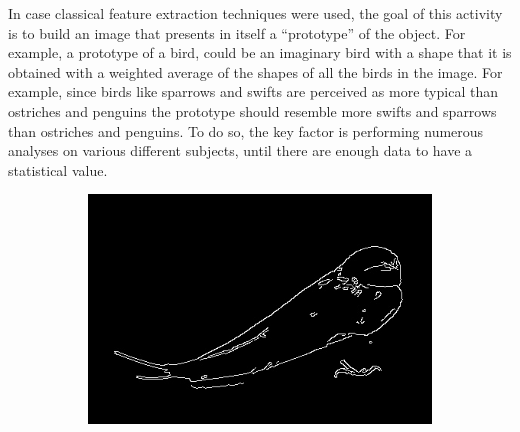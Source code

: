 \documentclass[conference]{IEEEtran}
\begin{document}
			\noindent In case classical feature extraction techniques were used, the goal of this activity is to build an image that presents in itself a ``prototype'' of the object. For example, a prototype of a bird, could be 
			an imaginary bird with a shape that it is obtained with a weighted average of the shapes of all the birds in the image. For example, since birds like sparrows and swifts are perceived as more 
			typical than ostriches and penguins the prototype should resemble more swifts and sparrows than ostriches and penguins. To do so, the key factor is performing numerous analyses on various 
			different subjects, until there are enough data to have a statistical value. 
			
			\begin{figure}[!t]
				\centering
				\begin{subfigure}[!t]{0.48\linewidth}
					\centerline{\includegraphics[width=0.9\linewidth]{imgs/swallow_edges.jpg}}
				\end{subfigure}
				\begin{subfigure}[!t]{0.48\linewidth}

\end{subfigure}
\end{figure}
\end{document}
